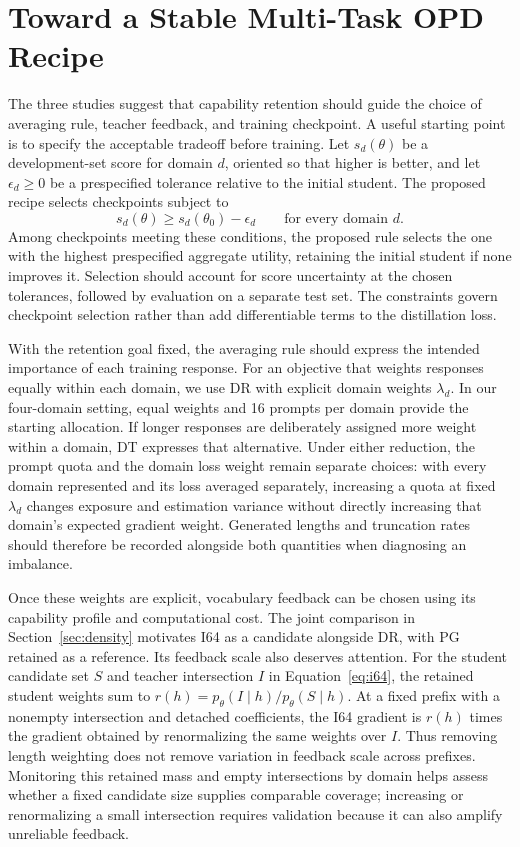 \section{Toward a Stable Multi-Task OPD Recipe}
\label{sec:recipe}

The three studies suggest that capability retention should guide the choice of averaging rule, teacher feedback, and training checkpoint. A useful starting point is to specify the acceptable tradeoff before training. Let $s_d(\theta)$ be a development-set score for domain $d$, oriented so that higher is better, and let $\epsilon_d\geq0$ be a prespecified tolerance relative to the initial student. The proposed recipe selects checkpoints subject to
\begin{equation}
s_d(\theta)\geq s_d(\theta_0)-\epsilon_d
\qquad\text{for every domain }d.
\label{eq:retention}
\end{equation}
Among checkpoints meeting these conditions, the proposed rule selects the one with the highest prespecified aggregate utility, retaining the initial student if none improves it. Selection should account for score uncertainty at the chosen tolerances, followed by evaluation on a separate test set. The constraints govern checkpoint selection rather than add differentiable terms to the distillation loss.

With the retention goal fixed, the averaging rule should express the intended importance of each training response. For an objective that weights responses equally within each domain, we use DR with explicit domain weights $\lambda_d$. In our four-domain setting, equal weights and 16 prompts per domain provide the starting allocation. If longer responses are deliberately assigned more weight within a domain, DT expresses that alternative. Under either reduction, the prompt quota and the domain loss weight remain separate choices: with every domain represented and its loss averaged separately, increasing a quota at fixed $\lambda_d$ changes exposure and estimation variance without directly increasing that domain's expected gradient weight. Generated lengths and truncation rates should therefore be recorded alongside both quantities when diagnosing an imbalance.

Once these weights are explicit, vocabulary feedback can be chosen using its capability profile and computational cost. The joint comparison in Section~\ref{sec:density} motivates I64 as a candidate alongside DR, with PG retained as a reference. Its feedback scale also deserves attention. For the student candidate set $S$ and teacher intersection $I$ in Equation~\ref{eq:i64}, the retained student weights sum to $r(h)=p_\theta(I\mid h)/p_\theta(S\mid h)$. At a fixed prefix with a nonempty intersection and detached coefficients, the I64 gradient is $r(h)$ times the gradient obtained by renormalizing the same weights over $I$. Thus removing length weighting does not remove variation in feedback scale across prefixes. Monitoring this retained mass and empty intersections by domain helps assess whether a fixed candidate size supplies comparable coverage; increasing or renormalizing a small intersection requires validation because it can also amplify unreliable feedback.

